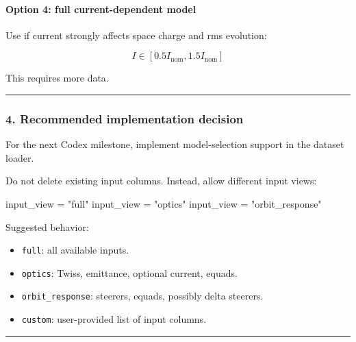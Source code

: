 \documentclass[
]{article}
\newenvironment{Shaded}{}{}
\newcommand{\NormalTok}[1]{#1}
\newcommand{\OperatorTok}[1]{\textcolor[rgb]{0.40,0.40,0.40}{#1}}
\newcommand{\StringTok}[1]{\textcolor[rgb]{0.25,0.44,0.63}{#1}}
\providecommand{\tightlist}{%
  \setlength{\itemsep}{0pt}\setlength{\parskip}{0pt}}
\begin{document}
\hypertarget{option-4-full-current-dependent-model}{%
\paragraph{Option 4: full current-dependent
model}\label{option-4-full-current-dependent-model}}

Use if current strongly affects space charge and rms evolution:

\[
I \in [0.5I_{\mathrm{nom}},1.5I_{\mathrm{nom}}]
\]

This requires more data.

\begin{center}\rule{0.5\linewidth}{0.5pt}\end{center}

\hypertarget{recommended-implementation-decision}{%
\subsubsection{4. Recommended implementation
decision}\label{recommended-implementation-decision}}

For the next Codex milestone, implement model-selection support in the
dataset loader.

Do not delete existing input columns. Instead, allow different input
views:

\begin{Shaded}
\begin{Highlighting}[]
\NormalTok{input\_view }\OperatorTok{=} \StringTok{"full"}
\NormalTok{input\_view }\OperatorTok{=} \StringTok{"optics"}
\NormalTok{input\_view }\OperatorTok{=} \StringTok{"orbit\_response"}
\end{Highlighting}
\end{Shaded}

Suggested behavior:

\begin{itemize}
\tightlist
\item
  \texttt{full}: all available inputs.
\item
  \texttt{optics}: Twiss, emittance, optional current, equads.
\item
  \texttt{orbit\_response}: steerers, equads, possibly delta steerers.
\item
  \texttt{custom}: user-provided list of input columns.
\end{itemize}

\begin{center}\rule{0.5\linewidth}{0.5pt}\end{center}
\end{document}
